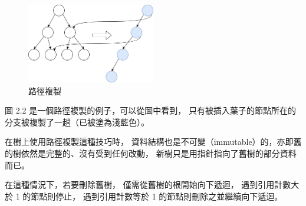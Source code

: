 \begin{figure}[ht]
\centerline{\includegraphics[width=0.5\textwidth]{../images/路徑複製.png}}
\caption{路徑複製}
\end{figure}

圖 2.2 是一個路徑複製的例子，可以從圖中看到，
只有被插入葉子的節點所在的分支被複製了一趟（已被塗為淺藍色）。

在樹上使用路徑複製這種技巧時，
資料結構也是不可變（immutable）的，亦即舊的樹依然是完整的、沒有受到任何改動，
新樹只是用指針指向了舊樹的部分資料而已。

在這種情況下，若要刪除舊樹，
僅需從舊樹的根開始向下遞迴，
遇到引用計數大於 1 的節點則停止，
遇到引用計數等於 1 的節點則刪除之並繼續向下遞迴。